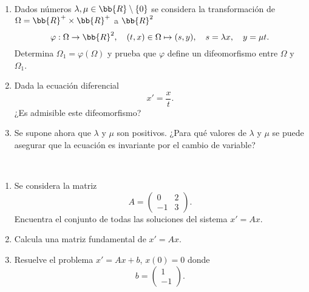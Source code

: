 \documentclass[12pt]{article}
\begin{document}
    \begin{ejercicio} [30 puntos] ~
        \begin{enumerate}
            \item Dados números $\lambda, \mu \in \bb{R} \setminus \{0\}$ se considera la transformación de $\Omega = \bb{R}^+ \times \bb{R}^+$ a $\bb{R}^2$
            \[
                \varphi : \Omega \to \bb{R}^2, \quad (t, x) \in \Omega \mapsto (s, y), \quad s = \lambda x, \quad y = \mu t.
            \]
            Determina $\Omega_1 = \varphi(\Omega)$ y prueba que $\varphi$ define un difeomorfismo entre $\Omega$ y $\Omega_1$.

            \item Dada la ecuación diferencial
            \[
                x' = \frac{x}{t}.
            \]
            ¿Es admisible este difeomorfismo?

            \item Se supone ahora que $\lambda$ y $\mu$ son positivos. ¿Para qué valores de $\lambda$ y $\mu$ se puede asegurar que la ecuación es invariante por el cambio de variable?
        \end{enumerate}
    \end{ejercicio}

    \begin{ejercicio} [30 puntos] ~
        \begin{enumerate}
            \item Se considera la matriz
            \[
                A = \begin{pmatrix}
                    0 & 2 \\
                    -1 & 3
                \end{pmatrix}.
            \]
            Encuentra el conjunto de todas las soluciones del sistema $x' = Ax$.

            \item Calcula una matriz fundamental de $x' = Ax$.

            \item Resuelve el problema $x' = Ax + b$, $x(0) = 0$ donde
            \[
                b = \begin{pmatrix}
                    1 \\
                    -1
                \end{pmatrix}.
            \]
        \end{enumerate}
    \end{ejercicio}
\end{document}
